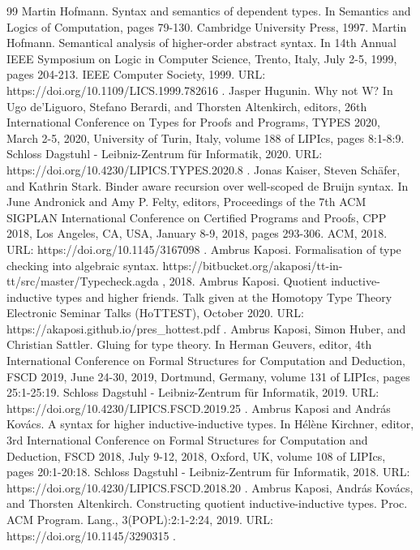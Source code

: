 \begin{thebibliography}{99}
 Martin Hofmann. Syntax and semantics of dependent types. In Semantics and Logics of Computation, pages 79-130. Cambridge University Press, 1997.
 Martin Hofmann. Semantical analysis of higher-order abstract syntax. In 14th Annual IEEE Symposium on Logic in Computer Science, Trento, Italy, July 2-5, 1999, pages 204-213. IEEE Computer Society, 1999. URL: https://doi.org/10.1109/LICS.1999.782616 .
 Jasper Hugunin. Why not W? In Ugo de'Liguoro, Stefano Berardi, and Thorsten Altenkirch, editors, 26th International Conference on Types for Proofs and Programs, TYPES 2020, March 2-5, 2020, University of Turin, Italy, volume 188 of LIPIcs, pages 8:1-8:9. Schloss Dagstuhl - Leibniz-Zentrum für Informatik, 2020. URL: https://doi.org/10.4230/LIPICS.TYPES.2020.8 .
 Jonas Kaiser, Steven Schäfer, and Kathrin Stark. Binder aware recursion over well-scoped de Bruijn syntax. In June Andronick and Amy P. Felty, editors, Proceedings of the 7th ACM SIGPLAN International Conference on Certified Programs and Proofs, CPP 2018, Los Angeles, CA, USA, January 8-9, 2018, pages 293-306. ACM, 2018. URL: https://doi.org/10.1145/3167098 .
 Ambrus Kaposi. Formalisation of type checking into algebraic syntax. https://bitbucket.org/akaposi/tt-in-tt/src/master/Typecheck.agda , 2018.
 Ambrus Kaposi. Quotient inductive-inductive types and higher friends. Talk given at the Homotopy Type Theory Electronic Seminar Talks (HoTTEST), October 2020. URL: https://akaposi.github.io/pres\_hottest.pdf .
 Ambrus Kaposi, Simon Huber, and Christian Sattler. Gluing for type theory. In Herman Geuvers, editor, 4th International Conference on Formal Structures for Computation and Deduction, FSCD 2019, June 24-30, 2019, Dortmund, Germany, volume 131 of LIPIcs, pages 25:1-25:19. Schloss Dagstuhl - Leibniz-Zentrum für Informatik, 2019. URL: https://doi.org/10.4230/LIPICS.FSCD.2019.25 .
 Ambrus Kaposi and András Kovács. A syntax for higher inductive-inductive types. In Hélène Kirchner, editor, 3rd International Conference on Formal Structures for Computation and Deduction, FSCD 2018, July 9-12, 2018, Oxford, UK, volume 108 of LIPIcs, pages 20:1-20:18. Schloss Dagstuhl - Leibniz-Zentrum für Informatik, 2018. URL: https://doi.org/10.4230/LIPICS.FSCD.2018.20 .
 Ambrus Kaposi, András Kovács, and Thorsten Altenkirch. Constructing quotient inductive-inductive types. Proc. ACM Program. Lang., 3(POPL):2:1-2:24, 2019. URL: https://doi.org/10.1145/3290315 .

\end{thebibliography}
